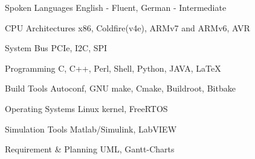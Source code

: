 

\begin{cvskills}

  \cvskill
    {Spoken Languages} %
    {English - Fluent, German - Intermediate} %

\cvskill
	{CPU Architectures} %
	{x86, Coldfire(v4e), ARMv7 and ARMv6, AVR} %

\cvskill
	{System Bus} %
	{PCIe, I2C, SPI} %

  \cvskill
    {Programming} %
    {C, C++, Perl, Shell, Python, JAVA, LaTeX} %
    
  \cvskill
  	{Build Tools} %
  	{Autoconf, GNU make, Cmake, Buildroot, Bitbake} %

  \cvskill
    {Operating Systems} %
    {Linux kernel, FreeRTOS} %

  \cvskill
    {Simulation Tools} %
    {Matlab/Simulink, LabVIEW} %

  \cvskill
    {Requirement \& Planning} %
    {UML, Gantt-Charts} %

\end{cvskills}
